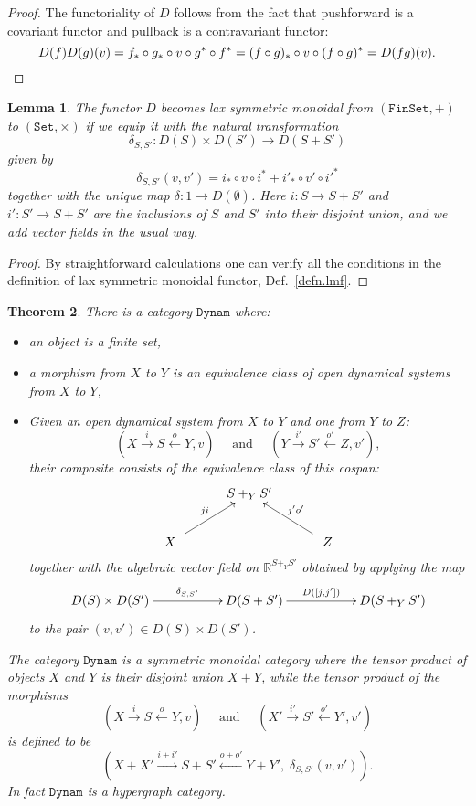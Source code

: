\documentclass{compositionalityarticle}
\newcommand{\R}{\mathbb{R}}
\newcommand{\FinSet}{\mathtt{FinSet}}
\newcommand{\Set}{\mathtt{Set}}
\newcommand{\Dynam}{\mathtt{Dynam}}
\newcommand{\maps}{\colon}
\theoremstyle{plain}
\newtheorem{thm}{Theorem}
\newtheorem{lem}[thm]{Lemma}
\theoremstyle{remark}
\begin{document}
\begin{proof}
The functoriality of $D$ follows from the fact that pushforward is a covariant functor and pullback is a contravariant functor:
\[   D(f)D(g)(v) = f_* \circ g_* \circ v \circ g^* \circ f^* = (f\circ g)_* \circ v \circ (f\circ g)^* = D(fg)(v).  \qedhere \]
\end{proof}

\begin{lem}
\label{lemma:DLax}
The functor $D$ becomes lax symmetric monoidal from $(\FinSet, +)$ to $(\Set, \times)$ if we equip it with the natural transformation 
\[ \delta_{S,S'} \maps D(S) \times D(S') \to D(S + S') \]
given by
\[  \delta_{S,S'}(v,v') = i_* \circ v \circ i^* + i'_* \circ v' \circ {i'}^* \]
together with the unique map $\delta \maps 1 \to D(\emptyset)$.
Here $i \maps S \to S+S'$ and $i' \maps S' \to S+S'$ are the inclusions of $S$ and $S'$ into their disjoint union, and we add vector fields in the usual way.
\end{lem}

\begin{proof}
By straightforward calculations one can verify all the conditions in the definition of lax symmetric monoidal functor, Def.\ \ref{defn.lmf}.   \end{proof}

\begin{thm}
\label{thm:dynam}
There is a category $\Dynam$ where:
\begin{itemize}
\item an object is a finite set,
\item a morphism from $X$ to $Y$ is an equivalence class of open dynamical
systems from $X$ to $Y$, 
\item Given an open dynamical system from $X$ to $Y$ and one from $Y$ to $Z$:
 \[
    (X \stackrel{i}\longrightarrow S \stackrel{o}\longleftarrow Y, v) 
    \quad \textrm{ and } \quad
    (Y \stackrel{i'}\longrightarrow S' \stackrel{o'}\longleftarrow Z, v'), 
  \]
their composite consists of the equivalence class of this cospan:
  \[
    \xymatrix{
      & S +_Y S' \\
      \quad X\quad \ar[ur]^{ji} && \quad Z \quad \ar[ul]_{j'o'}
    }
  \]
together with the algebraic vector field on $\R^{S+_Y S'}$ obtained by applying the map
\[      
\xymatrix{      D(S) \times D(S') \ar[rr]^-{\delta_{S,S'}} && 
                     D(S + S') \ar[rr]^-{D([j,j'])} && D(S +_Y S') } \]
to the pair $(v,v') \in D(S) \times D(S')$.  
\end{itemize}
The category $\Dynam$ is a symmetric monoidal category where the tensor product of objects $X$ and $Y$ is their disjoint union $X + Y$, while the tensor product of the morphisms
\[
    (X \stackrel{i}{\longrightarrow} S \stackrel{o}{\longleftarrow} Y, v) 
    \quad \textrm{ and } \quad
    (X' \stackrel{i'}{\longrightarrow} S' \stackrel{o'}{\longleftarrow} Y', v') 
  \]
is defined to be
\[  ( X + X' \stackrel{i+i'}{\longrightarrow} S + S'  \stackrel{o + o'}{\longleftarrow} Y + Y', \; \delta_{S,S'}(v,v') ) .\]
In fact $\Dynam$ is a hypergraph category.
\end{thm}
\end{document}
